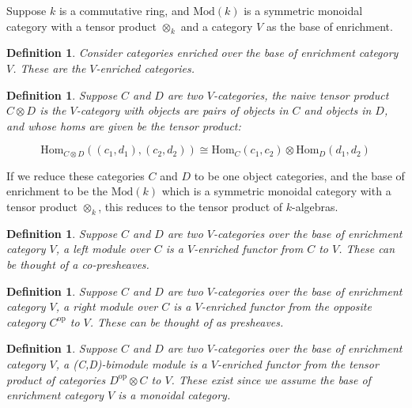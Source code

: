 \documentclass{tufte-book}
\newtheorem{definition}[theorem]{Definition}
\begin{document}
Suppose $k$ is a commutative ring, and $\mathrm{Mod}(k)$ is a symmetric monoidal category with a tensor product $\otimes_k$ and a category $V$ as the base of enrichment.

\begin{definition}
	Consider categories enriched over the base of enrichment category $V$. These are the $V$-enriched categories.
\end{definition}

\begin{definition}
	Suppose $C$ and $D$ are two $V$-categories, the naive tensor product $C \otimes D$ is the $V$-category with objects are pairs of objects in $C$ and objects in $D$, and whose homs are given be the tensor product:

\begin{equation}
	\mathrm{Hom}_{C \otimes D} ((c_1, d_1), (c_2, d_2)) \cong \mathrm{Hom}_{C}(c_1, c_2) \otimes \mathrm{Hom}_{D}(d_1, d_2)
\end{equation}

\end{definition}

If we reduce these categories $C$ and $D$ to be one object categories, and the base of enrichment to be the $\mathrm{Mod}(k)$ which is a symmetric monoidal category with a tensor product $\otimes_k$, this reduces to the tensor product of $k$-algebras.

\begin{definition}
	Suppose $C$ and $D$ are two $V$-categories over the base of enrichment category $V$, a left module over $C$ is a $V$-enriched functor from $C$ to $V$. These can be thought of a co-presheaves.
\end{definition}

\begin{definition}
	Suppose $C$ and $D$ are two $V$-categories over the base of enrichment category $V$, a right module over $C$ is a $V$-enriched functor from the opposite category $C^\mathrm{op}$ to $V$.
	These can be thought of as presheaves.
\end{definition}

\begin{definition}
	Suppose $C$ and $D$ are two $V$-categories over the base of enrichment category $V$, a (C,D)-bimodule module is a $V$-enriched functor from the tensor product of categories $D^\mathrm{op} \otimes C$ to $V$. These exist since we assume the base of enrichment category $V$ is a monoidal category.
\end{definition}
\end{document}
